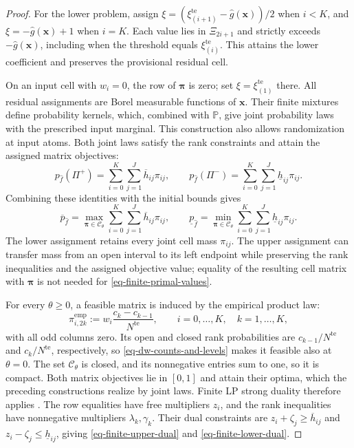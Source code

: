 \documentclass[review,11pt,3p,authoryear,nopreprintline]{elsarticle}
\begin{document}
\begin{proof}
  For the lower problem, assign $\xi=\left(\xi_{(i+1)}^{\mathrm{te}}-\hat g(\bm x)\right)/2$ when $i<K$, and $\xi=-\hat g(\bm x)+1$ when $i=K$. Each value lies in $\Xi_{2i+1}$ and strictly exceeds $-\hat g(\bm x)$, including when the threshold equals $\xi_{(i)}^{\mathrm{te}}$. This attains the lower coefficient and preserves the provisional residual cell.

  On an input cell with $w_i=0$, the row of $\bm\pi$ is zero; set $\xi=\xi_{(1)}^{\mathrm{te}}$ there. All residual assignments are Borel measurable functions of $\bm x$. Their finite mixtures define probability kernels, which, combined with $\mathbb P$, give joint probability laws with the prescribed input marginal. This construction also allows randomization at input atoms. Both joint laws satisfy the rank constraints and attain the assigned matrix objectives:
  \begin{equation*}
    p_{\hat f}(\Pi^+)=\sum_{i=0}^K\sum_{j=1}^J\overline h_{ij}\pi_{ij},
    \qquad
    p_{\hat f}(\Pi^-)=\sum_{i=0}^K\sum_{j=1}^J\underline h_{ij}\pi_{ij}.
  \end{equation*}
  Combining these identities with the initial bounds gives
  \begin{equation}
    \overline p_{\hat f}
    =\max_{\bm\pi\in\mathcal C_\theta}\sum_{i=0}^K\sum_{j=1}^J
      \overline h_{ij}\pi_{ij},\qquad
    \underline p_{\hat f}
    =\min_{\bm\pi\in\mathcal C_\theta}\sum_{i=0}^K\sum_{j=1}^J
      \underline h_{ij}\pi_{ij}.
    \label{eq-finite-primal-values}
  \end{equation}
  The lower assignment retains every joint cell mass $\pi_{ij}$. The upper assignment can transfer mass from an open interval to its left endpoint while preserving the rank inequalities and the assigned objective value; equality of the resulting cell matrix with $\bm\pi$ is not needed for \eqref{eq-finite-primal-values}.

  For every $\theta\ge0$, a feasible matrix is induced by the empirical product law:
  \begin{equation*}
    \pi_{i,2k}^{\mathrm{emp}}:=w_i\frac{c_k-c_{k-1}}{N^{\mathrm{te}}},
    \qquad i=0,\ldots,K,\quad k=1,\ldots,K,
  \end{equation*}
  with all odd columns zero. Its open and closed rank probabilities are $c_{k-1}/N^{\mathrm{te}}$ and $c_k/N^{\mathrm{te}}$, respectively, so \eqref{eq-dw-counts-and-levels} makes it feasible also at $\theta=0$. The set $\mathcal C_\theta$ is closed, and its nonnegative entries sum to one, so it is compact. Both matrix objectives lie in $[0,1]$ and attain their optima, which the preceding constructions realize by joint laws. Finite LP strong duality therefore applies \citep[Section~5.2.3]{B.V04}. The row equalities have free multipliers $z_i$, and the rank inequalities have nonnegative multipliers $\lambda_k,\gamma_k$. Their dual constraints are $z_i+\zeta_j\ge\overline h_{ij}$ and $z_i-\zeta_j\le\underline h_{ij}$, giving \eqref{eq-finite-upper-dual} and \eqref{eq-finite-lower-dual}.


\end{proof}
\end{document}
